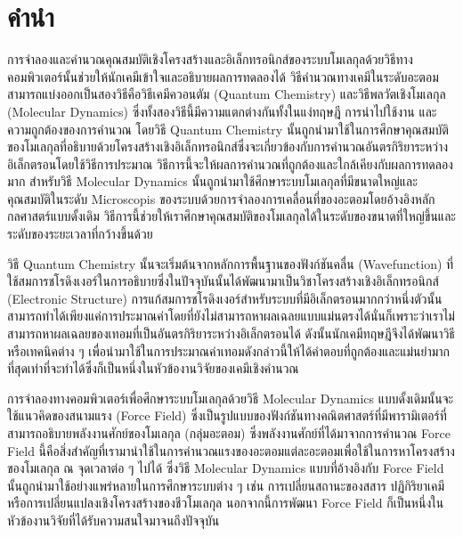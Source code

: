 

{

\chapter*{\centering คำนำ}

การจำลองและคำนวณคุณสมบัติเชิงโครงสร้างและอิเล็กทรอนิกส์ของระบบโมเลกุลด้วยวิธีทางคอมพิวเตอร์นั้นช่วยให้นักเคมีเข้าใจและอธิบายผลการทดลองได้ วิธีคำนวณทางเคมีในระดับอะตอมสามารถแบ่งออกเป็นสองวิธีคือวิธีเคมีควอนตัม (Quantum Chemistry) และวิธีพลวัตเชิงโมเลกุล (Molecular Dynamics) ซึ่งทั้งสองวิธีนี้มีความแตกต่างกันทั้งในแง่ทฤษฎี การนำไปใช้งาน และความถูกต้องของการคำนวณ โดยวิธี Quantum Chemistry นั้นถูกนำมาใช้ในการศึกษาคุณสมบัติของโมเลกุลที่อธิบายด้วยโครงสร้างเชิงอิเล็กทรอนิกส์ซึ่งจะเกี่ยวข้องกับการคำนวณอันตรกิริยาระหว่างอิเล็กตรอนโดยใช้วิธีการประมาณ วิธีการนี้จะให้ผลการคำนวณที่ถูกต้องและใกล้เคียงกับผลการทดลองมาก สำหรับวิธี Molecular Dynamics นั้นถูกนำมาใช้ศึกษาระบบโมเลกุลที่มีขนาดใหญ่และคุณสมบัติในระดับ Microscopis ของระบบด้วยการจำลองการเคลื่อนที่ของอะตอมโดยอ้างอิงหลักกลศาสตร์แบบดั้งเดิม วิธีการนี้ช่วยให้เราศึกษาคุณสมบัติของโมเลกุลได้ในระดับของขนาดที่ใหญ่ขึ้นและระดับของระยะเวลาที่กว้างขึ้นด้วย

วิธี Quantum Chemistry นั้นจะเริ่มต้นจากหลักการพื้นฐานของฟังก์ชันคลื่น (Wavefunction) ที่ใช้สมการชโรดิงเงอร์ในการอธิบายซึ่งในปัจจุบันนั้นได้พัฒนามาเป็นวิชาโครงสร้างเชิงอิเล็กทรอนิกส์ (Electronic Structure) การแก้สมการชโรดิงเงอร์สำหรับระบบที่มีอิเล็กตรอนมากกว่าหนึ่งตัวนั้นสามารถทำได้เพียงแค่การประมาณค่าโดยที่ยังไม่สามารถหาผลเฉลยแบบแม่นตรงได้นั่นก็เพราะว่าเราไม่สามารถหาผลเฉลยของเทอมที่เป็นอันตรกิริยาระหว่างอิเล็กตรอนได้ ดังนั้นนักเคมีทฤษฎีจึงได้พัฒนาวิธีหรือเทคนิคต่าง ๆ เพื่อนำมาใช้ในการประมาณค่าเทอมดังกล่าวนี้ให้ได้คำตอบที่ถูกต้องและแม่นยำมากที่สุดเท่าที่จะทำได้ซึ่งก็เป็นหนึ่งในหัวข้องานวิจัยของเคมีเชิงคำนวณ

การจำลองทางคอมพิวเตอร์เพื่อศึกษาระบบโมเลกุลด้วยวิธี Molecular Dynamics แบบดั้งเดิมนั้นจะใช้แนวคิดของสนามแรง (Force Field) ซึ่งเป็นรูปแบบของฟังก์ชันทางคณิตศาสตร์ที่มีพารามิเตอร์ที่สามารถอธิบายพลังงานศักย์ของโมเลกุล (กลุ่มอะตอม) ซึ่งพลังงานศักย์ที่ได้มาจากการคำนวณ Force Field นี้คือสิ่งสำคัญที่เรามานำใช้ในการคำนวณแรงของอะตอมแต่ละอะตอมเพื่อใช้ในการหาโครงสร้างของโมเลกุล ณ จุดเวลาต่อ ๆ ไปได้ ซึ่งวิธี Molecular Dynamics แบบที่อ้างอิงกับ Force Field นั้นถูกนำมาใช้อย่างแพร่หลายในการศึกษาระบบต่าง ๆ เช่น การเปลี่ยนสถานะของสสาร ปฏิกิริยาเคมีหรือการเปลี่ยนแปลงเชิงโครงสร้างของชีวโมเลกุล นอกจากนี้การพัฒนา Force Field ก็เป็นหนึ่งในหัวข้องานวิจัยที่ได้รับความสนใจมาจนถึงปัจจุบัน

}
